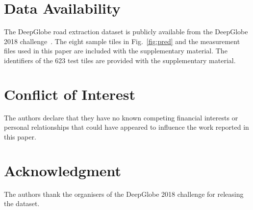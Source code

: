 \documentclass{ieeeaccess}
\begin{document}
\section*{Data Availability}

The DeepGlobe road extraction dataset is publicly available from the DeepGlobe 2018 challenge~\cite{demir2018deepglobe}. The eight sample tiles in Fig.~\ref{fig:pred} and the measurement files used in this paper are included with the supplementary material. The identifiers of the 623 test tiles are provided with the supplementary material.

\section*{Conflict of Interest}

The authors declare that they have no known competing financial interests or personal relationships that could have appeared to influence the work reported in this paper.

\section*{Acknowledgment}

The authors thank the organisers of the DeepGlobe 2018 challenge for releasing the dataset.
\end{document}
